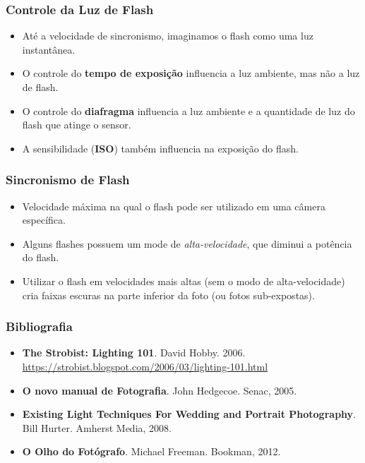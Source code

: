 
\begin{frame}
  \frametitle{Controle da Luz de Flash}
  \begin{itemize}
      \item Até a velocidade de sincronismo, imaginamos o flash como uma luz instantânea.
      \item O controle do \textbf{tempo de exposição} influencia a luz ambiente, mas não
      a luz de flash.
      \item O controle do \textbf{diafragma} influencia a luz ambiente e a quantidade de
      luz do flash que atinge o sensor.
      \item A sensibilidade (\textbf{ISO}) também influencia na exposição do flash.
  \end{itemize}
\end{frame}

\begin{frame}
  \frametitle{Sincronismo de Flash}
  \begin{itemize}
      \item Velocidade máxima na qual o flash pode ser utilizado em uma câmera
      específica.
      \item Alguns flashes possuem um mode de \textit{alta-velocidade}, que diminui
      a potência do flash.
      \item Utilizar o flash em velocidades mais altas (sem o modo de alta-velocidade)
      cria faixas escuras na parte inferior da foto (ou fotos sub-expostas).
  \end{itemize}
\end{frame}


\begin{frame}
    \frametitle{Bibliografia}
    \begin{itemize}
        \item \textbf{The Strobist: Lighting 101}. David Hobby. 2006.
        \hspace{2cm} \url{https://strobist.blogspot.com/2006/03/lighting-101.html}
        \item \textbf{O novo manual de Fotografia}. John Hedgecoe. Senac, 2005.
        \item \textbf{Existing Light Techniques For Wedding and Portrait Photography}.
        Bill Hurter. Amherst Media, 2008.
        \item \textbf{O Olho do Fotógrafo}. Michael Freeman. Bookman, 2012.
    \end{itemize}
\end{frame}


